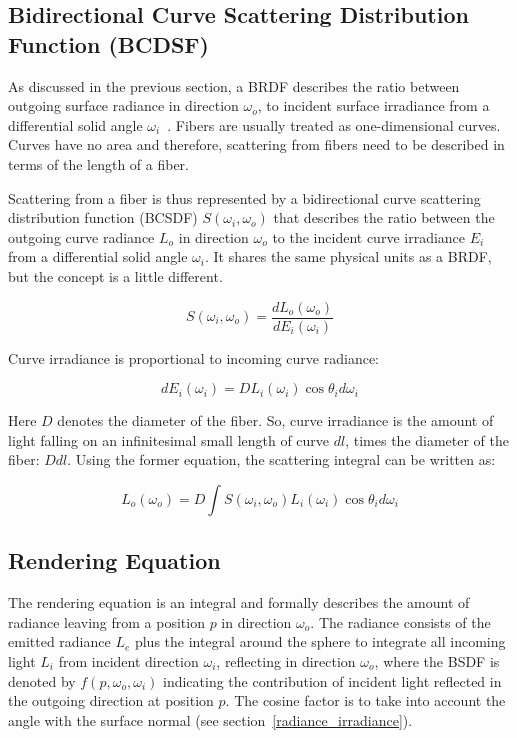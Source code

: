 \documentclass[11pt,a4paper]{report}
\begin{document}
\subsection{Bidirectional Curve Scattering Distribution Function (BCDSF)}
\label{sec_bcsdf}

As discussed in the previous section, a BRDF describes the ratio between outgoing surface radiance in direction $\omega_o$, to incident surface irradiance from a differential solid angle $\omega_i$~\cite{ward}. Fibers are usually treated as one-dimensional curves. Curves have no area and therefore, scattering from fibers need to be described in terms of the length of a fiber.

Scattering from a fiber is thus represented by a bidirectional curve scattering distribution function (BCSDF) $S(\omega_i, \omega_o)$ that describes the ratio between the outgoing curve radiance $L_o$ in direction $\omega_o$ to the incident curve irradiance $E_i$ from a differential solid angle $\omega_i$. It shares the same physical units as a BRDF, but the concept is a little different.

\begin{equation}
S(\omega_i, \omega_o) = \frac{dL_o(\omega_o)}{dE_i(\omega_i)}
\end{equation}

Curve irradiance is proportional to incoming curve radiance:

\begin{equation}
dE_i(\omega_i) = D L_i(\omega_i) \cos \theta_i d \omega_i
\end{equation}

Here $D$ denotes the diameter of the fiber. So, curve irradiance is the amount of light falling on an infinitesimal small length of curve $dl$, times the diameter of the fiber: $D dl$. Using the former equation, the scattering integral can be written as:

\begin{equation}
L_o(\omega_o) = D \int S(\omega_i, \omega_o) L_i(\omega_i) \cos \theta_i d \omega_i
\label{eq_bcsdf}
\end{equation}


\subsection{Rendering Equation}

The rendering equation is an integral and formally describes the amount of radiance leaving from a position $p$ in direction $\omega_o$. The radiance consists of the emitted radiance $L_e$ plus the integral around the sphere to integrate all incoming light $L_i$ from incident direction $\omega_i$, reflecting in direction $\omega_o$, where the BSDF is denoted by $f(p, \omega_o, \omega_i)$ indicating the contribution of incident light reflected in the outgoing direction at position $p$. The cosine factor is to take into account the angle with the surface normal (see section~\ref{radiance_irradiance}).
\end{document}
